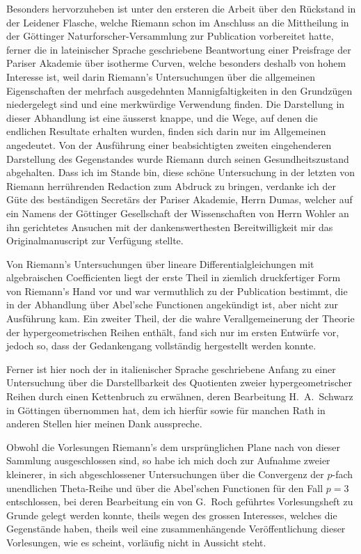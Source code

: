 \documentclass[11pt,a4paper]{article}
\theoremstyle{plain}
\theoremstyle{definition}
\begin{document}
Besonders hervorzuheben ist unter den ersteren die Arbeit \"uber den R\"uckstand in der Leidener Flasche, welche Riemann schon im Anschluss an die Mittheilung in der G\"ottinger Naturforscher-Versammlung zur Publication vorbereitet hatte, ferner die in lateinischer Sprache geschriebene Beantwortung einer Preisfrage der Pariser Akademie \"uber isotherme Curven, welche besonders deshalb von hohem Interesse ist, weil darin Riemann's Untersuchungen \"uber die allgemeinen Eigenschaften der mehrfach ausgedehnten Mannigfaltigkeiten in den Grundz\"ugen niedergelegt sind und eine merkw\"urdige Verwendung finden. Die Darstellung in dieser Abhandlung ist eine \"ausserst knappe, und die Wege, auf denen die endlichen Resultate erhalten wurden, finden sich darin nur im Allgemeinen angedeutet. Von der Ausf\"uhrung einer beabsichtigten zweiten eingehenderen Darstellung des Gegenstandes wurde Riemann durch seinen Gesundheitszustand abgehalten. Dass ich im Stande bin, diese sch\"one Untersuchung in der letzten von Riemann herr\"uhrenden Redaction zum Abdruck zu bringen, verdanke ich der G\"ute des best\"andigen Secret\"ars der Pariser Akademie, Herrn Dumas, welcher auf ein Namens der G\"ottinger Gesellschaft der Wissenschaften von Herrn Wohler an ihn gerichtetes Ansuchen mit der dankenswerthesten Bereitwilligkeit mir das Originalmanuscript zur Verf\"ugung stellte.

Von Riemann's Untersuchungen \"uber lineare Differentialgleichungen mit algebraischen Coefficienten liegt der erste Theil in ziemlich druckfertiger Form von Riemann's Hand vor und war vermuthlich zu der Publication bestimmt, die in der Abhandlung \"uber Abel'sche Functionen angek\"undigt ist, aber nicht zur Ausf\"uhrung kam. Ein zweiter Theil, der die wahre Verallgemeinerung der Theorie der hypergeometrischen Reihen enth\"alt, fand sich nur im ersten Entw\"urfe vor, jedoch so, dass der Gedankengang vollst\"andig hergestellt werden konnte.

\clearpage

Ferner ist hier noch der in italienischer Sprache geschriebene Anfang zu einer Untersuchung \"uber die Darstellbarkeit des Quotienten zweier hypergeometrischer Reihen durch einen Kettenbruch zu erw\"ahnen, deren Bearbeitung H.\ A.\ Schwarz in G\"ottingen \"ubernommen hat, dem ich hierf\"ur sowie f\"ur manchen Rath in anderen Stellen hier meinen Dank ausspreche.

Obwohl die Vorlesungen Riemann's dem urspr\"unglichen Plane nach von dieser Sammlung ausgeschlossen sind, so habe ich mich doch zur Aufnahme zweier kleinerer, in sich abgeschlossener Untersuchungen \"uber die Convergenz der $p$-fach unendlichen Theta-Reihe und \"uber die Abel'schen Functionen f\"ur den Fall $p = 3$ entschlossen, bei deren Bearbeitung ein von G.\ Roch gef\"uhrtes Vorlesungsheft zu Grunde gelegt werden konnte, theils wegen des grossen Interesses, welches die Gegenst\"ande haben, theils weil eine zusammenh\"angende Ver\"offentlichung dieser Vorlesungen, wie es scheint, vorl\"aufig nicht in Aussicht steht.
\end{document}
